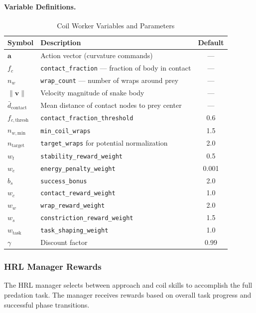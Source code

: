 \documentclass[11pt]{article}
\begin{document}
\paragraph{Variable Definitions.}

\begin{table}[H]
\centering
\caption{Coil Worker Variables and Parameters}
\begin{tabular}{@{}llc@{}}
\toprule
\textbf{Symbol} & \textbf{Description} & \textbf{Default} \\
\midrule
$\mathbf{a}$ & Action vector (curvature commands) & --- \\
$f_c$ & \texttt{contact\_fraction} --- fraction of body in contact & --- \\
$n_w$ & \texttt{wrap\_count} --- number of wraps around prey & --- \\
$\|\mathbf{v}\|$ & Velocity magnitude of snake body & --- \\
$\bar{d}_{\text{contact}}$ & Mean distance of contact nodes to prey center & --- \\
$f_{c,\text{thresh}}$ & \texttt{contact\_fraction\_threshold} & 0.6 \\
$n_{w,\text{min}}$ & \texttt{min\_coil\_wraps} & 1.5 \\
$n_{\text{target}}$ & \texttt{target\_wraps} for potential normalization & 2.0 \\
$w_t$ & \texttt{stability\_reward\_weight} & 0.5 \\
$w_e$ & \texttt{energy\_penalty\_weight} & 0.001 \\
$b_s$ & \texttt{success\_bonus} & 2.0 \\
$w_c$ & \texttt{contact\_reward\_weight} & 1.0 \\
$w_w$ & \texttt{wrap\_reward\_weight} & 2.0 \\
$w_s$ & \texttt{constriction\_reward\_weight} & 1.5 \\
$w_{\text{task}}$ & \texttt{task\_shaping\_weight} & 1.0 \\
$\gamma$ & Discount factor & 0.99 \\
\bottomrule
\end{tabular}
\end{table}

\subsubsection{HRL Manager Rewards}

The HRL manager selects between approach and coil skills to accomplish the full predation task. The manager receives rewards based on overall task progress and successful phase transitions.
\end{document}
